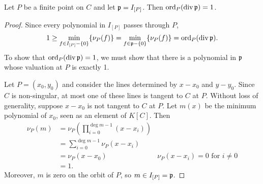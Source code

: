 \begin{lemma}
  \label{lem_order_is_1}
  Let $P$ be a finite point on $C$ and let $\frak p = I_{[P]}$.
  Then $\operatorname{ord}_P(\operatorname{div} \frak p) = 1$.
\end{lemma}
\begin{proof}
  Since every polynomial in $I_{[P]}$ passes through $P$,
  \[ 1 \geq \min_{f \in I_{[P]} - \{0\}}\{ \nu_P(f) \}
          = \min_{f \in \frak p - \{0\}}\{ \nu_P(f) \}
          = \operatorname{ord}_P(\operatorname{div} \frak p). \]
  To show that $\operatorname{ord}_P(\operatorname{div} \frak p) = 1$,
  we must show that there is a polynomial in $\frak p$ whose valuation at $P$ is exactly 1.
  
  Let $P = (x_0, y_0)$ and consider the lines determined by $x - x_0$ and $y - y_0$.
  Since $C$ is non-singular, at most one of these lines is tangent to $C$ at $P$.
  Without loss of generality, suppose $x - x_0$ is not tangent to $C$ at $P$.
  Let $m(x)$ be the minimum polynomial of $x_0$, seen as an element of $K[C]$. Then
  \begin{align*}
    \nu_P(m)
      &= \nu_P\left( \prod_{i=0}^{\deg m - 1}(x - x_i)\right) \\
      &= \sum_{i=0}^{\deg m - 1} \nu_P(x - x_i) \\
      &= \nu_P(x - x_0)
        & \text{$\nu_P(x - x_i) = 0$ for $i \neq 0$} \\
      &= 1.
  \end{align*}
  Moreover, $m$ is zero on the orbit of $P$, so $m \in I_{[P]} = \frak p$.
\end{proof}

